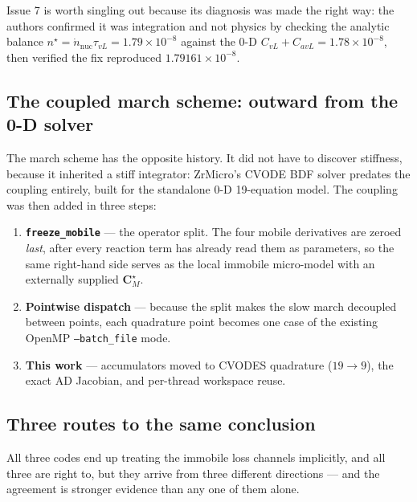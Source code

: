 \documentclass[11pt,a4paper]{article}
\newcommand{\code}[1]{\texttt{\small #1}}
\begin{document}
Issue 7 is worth singling out because its diagnosis was made the right way: the
authors confirmed it was integration and not physics by checking the analytic
balance $n^\star=\dot n_{\mathrm{nuc}}\tau_{vL}=1.79\times10^{-8}$ against the
0-D $C_{vL}+C_{avL}=1.78\times10^{-8}$, then verified the fix reproduced
$1.79161\times10^{-8}$.

\subsection{The coupled march scheme: outward from the 0-D solver}

The march scheme has the opposite history. It did not have to discover
stiffness, because it inherited a stiff integrator: ZrMicro's CVODE BDF solver
predates the coupling entirely, built for the standalone 0-D 19-equation model.
The coupling was then added in three steps:

\begin{enumerate}
\item \textbf{\code{freeze\_mobile}} --- the operator split. The four mobile
      derivatives are zeroed \emph{last}, after every reaction term has already
      read them as parameters, so the same right-hand side serves as the local
      immobile micro-model with an externally supplied $\mathbf C_M^\star$.
\item \textbf{Pointwise dispatch} --- because the split makes the slow march
      decoupled between points, each quadrature point becomes one case of the
      existing OpenMP \code{--batch\_file} mode.
\item \textbf{This work} --- accumulators moved to CVODES quadrature
      ($19\to9$), the exact AD Jacobian, and per-thread workspace reuse.
\end{enumerate}

\subsection{Three routes to the same conclusion}

All three codes end up treating the immobile loss channels implicitly, and all
three are right to, but they arrive from three different directions --- and the
agreement is stronger evidence than any one of them alone.
\end{document}
